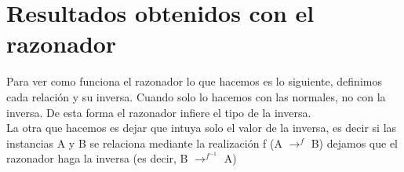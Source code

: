 \documentclass[12pt, titlepage, a4paper]{article}
\begin{document}
\section{Resultados obtenidos con el razonador}
Para ver como funciona el razonador lo que hacemos es lo siguiente, 
definimos cada relación y su inversa. Cuando  solo 
lo hacemos con las normales, no con la inversa. De esta forma el 
razonador infiere el tipo de la inversa.\\

La otra que hacemos es dejar que intuya solo el valor de la inversa, 
es decir si las instancias A y B se relaciona mediante la realización 
f (A $\rightarrow^f$ B) dejamos que el razonador haga la inversa 
(es decir, B $\rightarrow^{f^{-1}}$ A)

\end{document}
